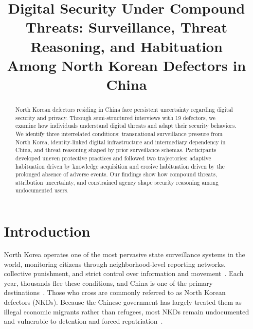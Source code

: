 \documentclass[conference,compsoc]{IEEEtran}
\begin{document}
\title{Digital Security Under Compound Threats: Surveillance, Threat Reasoning, and Habituation Among North Korean Defectors in China}

\author{
}

\maketitle

\begin{abstract}

North Korean defectors residing in China face persistent uncertainty regarding digital security and privacy. Through semi-structured interviews with 19 defectors, we examine how individuals understand digital threats and adapt their security behaviors. We identify three interrelated conditions: transnational surveillance pressure from North Korea, identity-linked digital infrastructure and intermediary dependency in China, and threat reasoning shaped by prior surveillance schemas. Participants developed uneven protective practices and followed two trajectories: adaptive habituation driven by knowledge acquisition and erosive habituation driven by the prolonged absence of adverse events. Our findings show how compound threats, attribution uncertainty, and constrained agency shape security reasoning among undocumented users.

\end{abstract}


\IEEEpeerreviewmaketitle

\section{Introduction}

North Korea operates one of the most pervasive state surveillance systems in the world, monitoring citizens through neighborhood-level reporting networks, collective punishment, and strict control over information and movement~\cite{warf2015hermit,lankov2014north}. Each year, thousands flee these conditions, and China is one of the primary destinations~\cite{lankov2004north,chang2008migration}. Those who cross are commonly referred to as North Korean defectors (NKDs). Because the Chinese government has largely treated them as illegal economic migrants rather than refugees, most NKDs remain undocumented and vulnerable to detention and forced repatriation~\cite{cho2013systemizing,beck2007perilous}.
\end{document}
